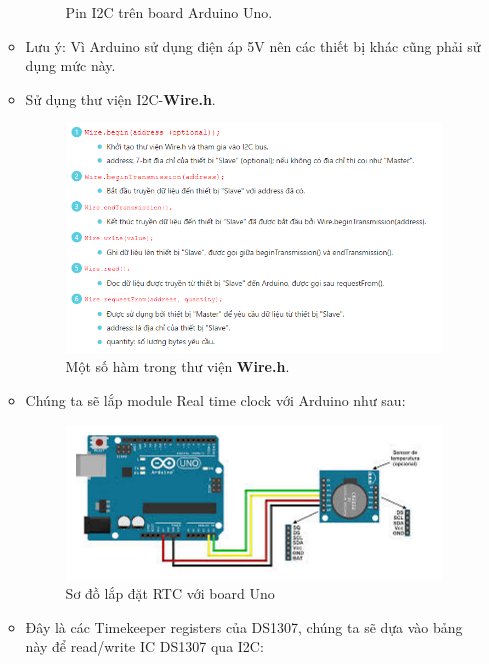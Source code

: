 \documentclass[a4paper,12pt,oneside]{article}
\begin{document}
\begin{itemize}
\begin{itemize}
\begin{figure}[h!]
\begin{center}
\end{center}
\caption{Pin I2C trên board Arduino Uno.}
\end{figure}
\item Lưu ý: Vì Arduino sử dụng điện áp 5V nên các thiết bị khác cũng phải sử dụng mức này.
\item Sử dụng thư viện I2C-\textbf{Wire.h}.
\begin{figure}[h!]
\begin{center}
\includegraphics[scale=0.8]{hinh/wire.png}
\end{center}
\caption{Một số hàm trong thư viện \textbf{Wire.h}.}
\end{figure}
\item Chúng ta sẽ lắp module Real time clock với Arduino như sau:
\begin{figure}[H]
\begin{center}
\includegraphics[scale=0.8]{hinh/lapdatRTC.png}
\end{center}
\caption{Sơ đồ lắp đặt RTC với board Uno}
\end{figure}
\item Đây là các Timekeeper registers của DS1307, chúng ta sẽ dựa vào bảng này để read/write IC  DS1307 qua I2C:
\begin{figure}[H]

\end{figure}
\end{itemize}
\end{itemize}
\end{document}

